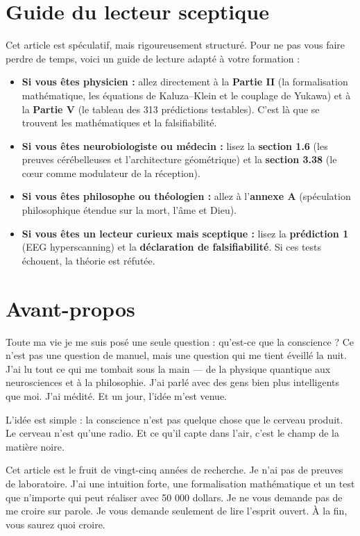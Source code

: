 \documentclass[11pt,a4paper]{article}
\begin{document}
\section*{Guide du lecteur sceptique}
Cet article est spéculatif, mais rigoureusement structuré. Pour ne pas vous faire perdre de temps, voici un guide de lecture adapté à votre formation :
\begin{itemize}
    \item \textbf{Si vous êtes physicien :} allez directement à la \textbf{Partie II} (la formalisation mathématique, les équations de Kaluza--Klein et le couplage de Yukawa) et à la \textbf{Partie V} (le tableau des 313 prédictions testables). C'est là que se trouvent les mathématiques et la falsifiabilité.
    \item \textbf{Si vous êtes neurobiologiste ou médecin :} lisez la \textbf{section 1.6} (les preuves cérébelleuses et l'architecture géométrique) et la \textbf{section 3.38} (le cœur comme modulateur de la réception).
    \item \textbf{Si vous êtes philosophe ou théologien :} allez à l'\textbf{annexe A} (spéculation philosophique étendue sur la mort, l'âme et Dieu).
    \item \textbf{Si vous êtes un lecteur curieux mais sceptique :} lisez la \textbf{prédiction 1} (EEG hyperscanning) et la \textbf{déclaration de falsifiabilité}. Si ces tests échouent, la théorie est réfutée.
\end{itemize}

\section*{Avant-propos}
Toute ma vie je me suis posé une seule question : qu'est-ce que la conscience ? Ce n'est pas une question de manuel, mais une question qui me tient éveillé la nuit. J'ai lu tout ce qui me tombait sous la main --- de la physique quantique aux neurosciences et à la philosophie. J'ai parlé avec des gens bien plus intelligents que moi. J'ai médité. Et un jour, l'idée m'est venue.

L'idée est simple : la conscience n'est pas quelque chose que le cerveau produit. Le cerveau n'est qu'une radio. Et ce qu'il capte dans l'air, c'est le champ de la matière noire.

Cet article est le fruit de vingt-cinq années de recherche. Je n'ai pas de preuves de laboratoire. J'ai une intuition forte, une formalisation mathématique et un test que n'importe qui peut réaliser avec 50 000 dollars. Je ne vous demande pas de me croire sur parole. Je vous demande seulement de lire l'esprit ouvert. À la fin, vous saurez quoi croire.
\end{document}
